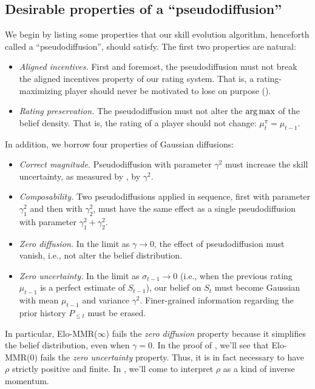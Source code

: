 \subsection{Desirable properties of a ``pseudodiffusion''}
\label{sec:desirable-props}
We begin by listing some properties that our skill evolution algorithm, henceforth called a ``pseudodiffusion'', should satisfy. The first two properties are natural:
\begin{itemize}[leftmargin=*]
\item \emph{Aligned incentives.} First and foremost, the pseudodiffusion must not break the aligned incentives property of our rating system. That is, a rating-maximizing player should never be motivated to lose on purpose ().
\item \emph{Rating preservation.} The pseudodiffusion must not alter the $\operatorname*{arg\,max}$ of the belief density. That is, the rating of a player should not change: $\mu^\pi_t = \mu_{t-1}$.
\end{itemize}
In addition, we borrow four properties of Gaussian diffusions:
\begin{itemize}[leftmargin=*]
\item \emph{Correct magnitude.} Pseudodiffusion with parameter $\gamma^2$ must increase the skill uncertainty, as measured by , by $\gamma^2$.
\item \emph{Composability.} Two pseudodiffusions applied in sequence, first with parameter $\gamma_1^2$ and then with $\gamma_2^2$, must have the same effect as a single pseudodiffusion with parameter $\gamma_1^2 + \gamma_2^2$.
\item \emph{Zero diffusion.} In the limit as $\gamma \rightarrow 0$, the effect of pseudodiffusion must vanish, i.e., not alter the belief distribution.
\item \emph{Zero uncertainty.} In the limit as $\sigma_{t-1}\rightarrow 0$ (i.e., when the previous rating $\mu_{t-1}$ is a perfect estimate of $S_{t-1}$), our belief on $S_t$ must become Gaussian with mean $\mu_{t-1}$ and variance $\gamma^2$. Finer-grained information regarding the prior history $P_{\le t}$ must be erased.
\end{itemize}
In particular, Elo-MMR($\infty$) fails the \emph{zero diffusion} property because it simplifies the belief distribution, even when $\gamma=0$. In the proof of , we'll see that Elo-MMR($0$) fails the \emph{zero uncertainty} property. Thus, it is in fact necessary to have $\rho$ strictly positive and finite. In , we'll come to interpret $\rho$ as a kind of inverse momentum.

